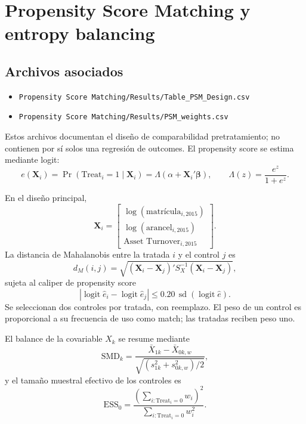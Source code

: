 \documentclass[11pt]{article}
\newcommand{\Treat}{\mathrm{Treat}}
\newcommand{\file}[1]{\texttt{#1}}
\begin{document}
\section{Propensity Score Matching y entropy balancing}

\subsection*{Archivos asociados}
\begin{itemize}
 \item \file{Propensity Score Matching/Results/Table\_PSM\_Design.csv}
 \item \file{Propensity Score Matching/Results/PSM\_weights.csv}
\end{itemize}

Estos archivos documentan el diseño de comparabilidad pretratamiento; no
contienen por sí solos una regresión de outcomes. El propensity score se estima
mediante logit:
\begin{equation}
 e(\mathbf X_i)
 =\Pr(\Treat_i=1\mid\mathbf X_i)
 =\Lambda(\alpha+\mathbf X_i'\boldsymbol\beta),
 \qquad
 \Lambda(z)=\frac{e^z}{1+e^z}.
\end{equation}

En el diseño principal,
\begin{equation}
 \mathbf X_i=
 \begin{bmatrix}
  \log(\text{matrícula}_{i,2015}) \\
  \log(\text{arancel}_{i,2015}) \\
  \text{Asset Turnover}_{i,2015}
 \end{bmatrix}.
\end{equation}
La distancia de Mahalanobis entre la tratada $i$ y el control $j$ es
\begin{equation}
 d_M(i,j)=
 \sqrt{(\mathbf X_i-\mathbf X_j)'
 S_X^{-1}(\mathbf X_i-\mathbf X_j)},
\end{equation}
sujeta al caliper de propensity score
\begin{equation}
 \left|\operatorname{logit}\widehat e_i-
       \operatorname{logit}\widehat e_j\right|
 \leq 0.20\,
 \operatorname{sd}\!\left(\operatorname{logit}\widehat e\right).
\end{equation}
Se seleccionan dos controles por tratada, con reemplazo. El peso de un control
es proporcional a su frecuencia de uso como match; las tratadas reciben peso
uno.

El balance de la covariable $X_k$ se resume mediante
\begin{equation}
 \mathrm{SMD}_k=
 \frac{\bar X_{1k}-\bar X_{0k,w}}
 {\sqrt{(s_{1k}^2+s_{0k,w}^2)/2}},
\end{equation}
y el tamaño muestral efectivo de los controles es
\begin{equation}
 \mathrm{ESS}_0=\frac{\left(\sum_{i:\Treat_i=0}w_i\right)^2}
 {\sum_{i:\Treat_i=0}w_i^2}.
\end{equation}
\end{document}
